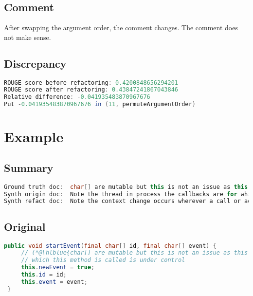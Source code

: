 \documentclass[11pt]{article}
\DeclareRobustCommand{\hlblue}[1]{{\sethlcolor{SeaGreen}\hl{#1}}}
\DeclareRobustCommand{\hlblue}[1]{{\sethlcolor{SkyBlue}\hl{#1}}}
\begin{document}
\subsection{Comment}

After swapping the argument order, the comment changes. The comment does not make sense.

\subsection{Discrepancy}

\begin{lstlisting}[language=java]
ROUGE score before refactoring: 0.4200848656294201
ROUGE score after refactoring: 0.43847241867043846
Relative difference: -0.041935483870967676
Put -0.041935483870967676 in (11, permuteArgumentOrder)
\end{lstlisting}




\pagebreak
\section{Example}
\subsection{Summary}

\begin{lstlisting}[language=java]
Ground truth doc:  char[] are mutable but this is not an issue as this class is package-protected and the code from
Synth origin doc:  Note the thread in process the callbacks are for which event listeners and thus that it identifies a
Synth refact doc:  Note the context change occurs wherever a call or action from this instance which originated within a transaction instance
\end{lstlisting}

\subsection{Original}
\begin{lstlisting}[language=java]
 public void startEvent(final char[] id, final char[] event) {
     // (*@\hlblue{char[] are mutable but this is not an issue as this class is package-protected and the code from}@*)
     // which this method is called is under control
     this.newEvent = true;
     this.id = id;
     this.event = event;
 }
\end{lstlisting}
\end{document}
